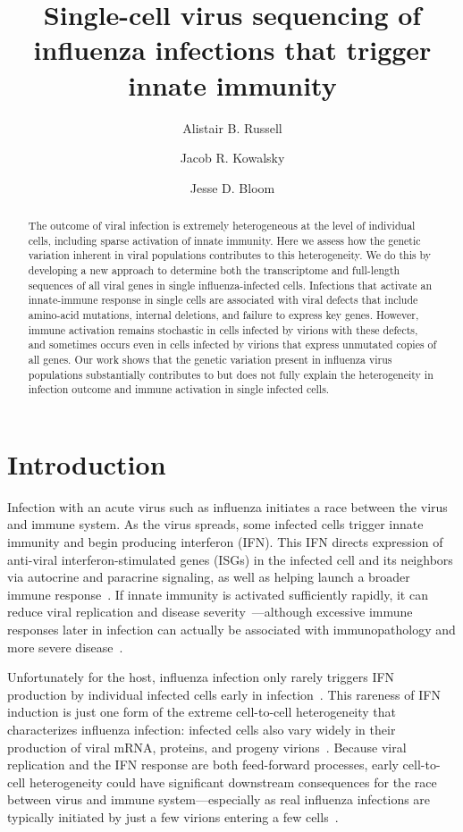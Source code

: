 \documentclass[9pt,lineno]{elife}
\title{Single-cell virus sequencing of influenza infections that trigger innate immunity}
\author[1]{Alistair B. Russell}
\author[1]{Jacob R. Kowalsky}
\author[1,2,3*]{Jesse D. Bloom}
\affil[1]{Basic Sciences Division and Computational Biology Program, Fred Hutchinson Cancer Research Center, Seattle, United States}
\affil[2]{Department of Genome Sciences, University of Washington, Seattle, United States}
\affil[3]{Howard Hughes Medical Institute, Fred Hutchinson Cancer Research Center, Seattle, United States}
\begin{document}
\maketitle

\begin{abstract}
The outcome of viral infection is extremely heterogeneous at the level of individual cells, including sparse activation of innate immunity.  
Here we assess how the genetic variation inherent in viral populations contributes to this heterogeneity.
We do this by developing a new approach to determine both the transcriptome and full-length sequences of all viral genes in single influenza-infected cells.
Infections that activate an innate-immune response in single cells are associated with viral defects that include amino-acid mutations, internal deletions, and failure to express key genes.  
However, immune activation remains stochastic in cells infected by virions with these defects, and sometimes occurs even in cells infected by virions that express unmutated copies of all genes.
Our work shows that the genetic variation present in influenza virus populations substantially contributes to but does not fully explain the heterogeneity in infection outcome and immune activation in single infected cells.
\end{abstract}


\section{Introduction}
Infection with an acute virus such as influenza initiates a race between the virus and immune system.
As the virus spreads, some infected cells trigger innate immunity and begin producing interferon (IFN).
This IFN directs expression of anti-viral interferon-stimulated genes (ISGs) in the infected cell and its neighbors via autocrine and paracrine signaling, as well as helping launch a broader immune response~\citep{stetson2006type,honda2006type}.
If innate immunity is activated sufficiently rapidly, it can reduce viral replication and disease severity~\citep{solov1969results,treanor1987intranasally,beilharz2007protection,kugel2009intranasal,steel2010transmission}---although excessive immune responses later in infection can actually be associated with immunopathology and more severe disease~\citep{la2007question, iwasaki2014innate}.

Unfortunately for the host, influenza infection only rarely triggers IFN production by individual infected cells early in infection~\citep{kallfass2013visualizing, killip2017single}.
This rareness of IFN induction is just one form of the extreme cell-to-cell heterogeneity that characterizes influenza infection: infected cells also vary widely in their production of viral mRNA, proteins, and progeny virions~\citep{russell2018extreme,steuerman2018dissection,sjaastad2018distinct,heldt2015single}.
Because viral replication and the IFN response are both feed-forward processes, early cell-to-cell heterogeneity could have significant downstream consequences for the race between virus and immune system---especially as real influenza infections are typically initiated by just a few virions entering a few cells~\citep{mccrone2018stochastic, xue2018reconciling, varble2014influenza}.
\end{document}

